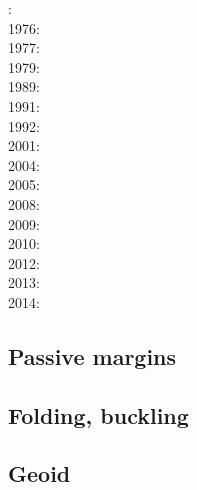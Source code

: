 : \cite{fouy75}\\
1976: \cite{riso76}\\
1977: \cite{chtu77}\\
1979: \cite{riso79}\\
1989: \cite{boww89}\\
1991: \cite{worg91}\\
1992: \cite{rich92}\cite{wuvr92}\cite{zoba92}\cite{clko92}\\
2001: \cite{stsm01}\\
2004: \cite{ligu04}\\
2005: \cite{timr05}\\
2008: \cite{bilr08}\cite{ghhw08}\\
2009: \cite{ghhf09}\cite{nacl09}\\
2010: \cite{bepo10}\\
2012: \cite{nalr12}\cite{ghho12}\\
2013: \cite{ghhw13}\\
2014: \cite{vagw14}


\subsection*{Passive margins} 

\cite{clwv82}
\cite{lies86}
\cite{gebi05}
\cite{clbz08}
\cite{kasb08}
\cite{fasm10}
\cite{nigm10}
\cite{rapy11}
\cite{nigm11}
\cite{brfo11}
\cite{mana13}
\cite{yahb13}
\cite{macg14}
\cite{gebw15}
\cite{nigo15}
\cite{sahf18}
\cite{mube18}
\cite{tebu18}
\cite{zhli19}


\subsection*{Folding, buckling} 
 

\noindent
\cite{ramb68}
\cite{ramb70}
\cite{ramb71}
\cite{flet91}
\cite{zhhj93}
\cite{flet95}
\cite{zhho96}
\cite{mumh02}
\cite{frsc06}
\cite{schm08}
\cite{resb10}
\cite{freh11}
\cite{reds12}\cite{grsc12}
\cite{regc13}
\cite{freh14}\cite{frex14}
\cite{frsc16}


\subsection*{Geoid}

